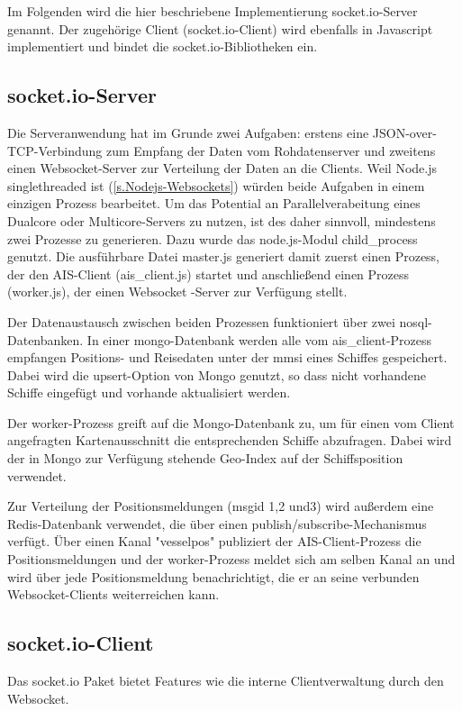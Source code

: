 Im Folgenden wird die hier beschriebene Implementierung socket.io-Server genannt. Der zugehörige Client (socket.io-Client) wird ebenfalls in Javascript implementiert und bindet die socket.io-Bibliotheken ein.

\subsection{socket.io-Server}
Die Serveranwendung hat im Grunde zwei Aufgaben: erstens eine JSON-over-TCP-Verbindung zum Empfang der Daten vom Rohdatenserver und zweitens einen Websocket-Server zur Verteilung der Daten an die Clients.
Weil Node.js singlethreaded ist (\ref{s.Nodejs-Websockets}) würden beide Aufgaben in einem einzigen Prozess bearbeitet. Um das Potential an Parallelverabeitung eines Dualcore oder Multicore-Servers zu nutzen, ist des daher sinnvoll, mindestens zwei Prozesse zu generieren. Dazu wurde das node.js-Modul child\_process genutzt. Die ausführbare Datei master.js generiert damit zuerst einen Prozess, der den AIS-Client (ais\_client.js) startet und anschließend einen Prozess (worker.js), der einen Websocket -Server zur Verfügung stellt.

Der Datenaustausch zwischen beiden Prozessen funktioniert über zwei nosql-Datenbanken. In einer mongo-Datenbank werden alle vom ais\_client-Prozess empfangen Positions- und Reisedaten  unter der mmsi eines Schiffes gespeichert. Dabei wird die upsert-Option von Mongo genutzt, so dass nicht vorhandene Schiffe eingefügt und vorhande aktualisiert werden.

Der worker-Prozess greift auf die Mongo-Datenbank zu, um für einen vom Client angefragten Kartenausschnitt die entsprechenden Schiffe abzufragen. Dabei wird der in Mongo zur Verfügung stehende Geo-Index auf der Schiffsposition verwendet.

Zur Verteilung der Positionsmeldungen (msgid 1,2 und3)  wird außerdem eine Redis-Datenbank verwendet, die über einen publish/subscribe-Mechanismus verfügt. Über einen Kanal "vesselpos" publiziert der AIS-Client-Prozess die Positionsmeldungen und der worker-Prozess meldet sich am selben Kanal an und wird über jede Positionsmeldung benachrichtigt, die er an seine verbunden Websocket-Clients weiterreichen kann.

\subsection{socket.io-Client}
Das socket.io Paket bietet Features wie die interne Clientverwaltung durch den Websocket.

